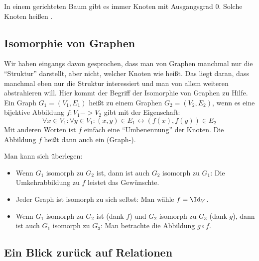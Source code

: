 In einem gerichteten Baum gibt es immer Knoten mit Ausgangsgrad $0$.
% 
Solche Knoten heißen .

\begin{extract*}
  \subsection{Isomorphie von Graphen}
\end{extract*}
\label{subsub:isomorphie}

Wir haben eingangs davon gesprochen, dass man von Graphen manchmal nur
die "`Struktur"' darstellt, aber nicht, welcher Knoten wie heißt.
% 
Das liegt daran, dass manchmal eben nur die Struktur interessiert und
man von allem weiteren abstrahieren will.
% 
Hier kommt der Begriff der Isomorphie von Graphen zu Hilfe.
% 
Ein Graph $G_1=(V_1,E_1)$ heißt  zu einem Graphen $G_2=(V_2,E_2)$, wenn
es eine bijektive Abbildung $f:V_1-> V_2$ gibt mit der Eigenschaft:
\[ \forall x\in V_1: \forall y\in V_1: (x,y)\in E_1 \longleftrightarrow
(f(x),f(y))\in E_2
\] Mit anderen Worten ist $f$ einfach eine "`Umbenennung"' der Knoten.
Die Abbildung $f$ heißt dann auch ein
(Graph-).

Man kann sich überlegen:
\begin{itemize}
\item Wenn $G_1$ isomorph zu $G_2$ ist, dann ist auch $G_2$ isomorph
zu $G_1$: Die Umkehrabbildung zu $f$ leistet das Gewünschte.
\item Jeder Graph ist isomorph zu sich selbst: Man wähle $f=\Id_V$.
\item Wenn $G_1$ isomorph zu $G_2$ ist (dank $f$) und $G_2$ isomorph
zu $G_3$ (dank $g$), dann ist auch $G_1$ isomorph zu $G_3$: Man
betrachte die Abbildung $g\circ f$.
\end{itemize}


\begin{extract*}
  \subsection{Ein Blick zur\"uck auf Relationen}
\end{extract*}
\label{subsub:relationen-revisited}

